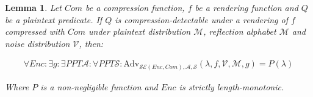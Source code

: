 \documentclass{article}
\newtheorem*{lemma}{Lemma}
\begin{document}
\begin{lemma}

Let $Com$ be a compression function, $f$ be a rendering function and $Q$
be a plaintext predicate. If $Q$ is compression-detectable under a rendering
of $f$ compressed with $Com$
under plaintext distribution
$\mathcal{M}$, reflection alphabet $\mathcal{M}$ and noise distribution
$\mathcal{V}$, then:

\begin{align*}
\forall Enc:
\exists g:
\exists PPT \mathcal{A}:
\forall PPT \mathcal{S}:
\text{Adv}_{\mathcal{SE}(Enc, Com), \mathcal{A}, \mathcal{S}}(\lambda, f, \mathcal{V}, \mathcal{M}, g) = P(\lambda)
\end{align*}

Where $P$ is a non-negligible function and $Enc$
is strictly length-monotonic.

\end{lemma}
\end{document}
